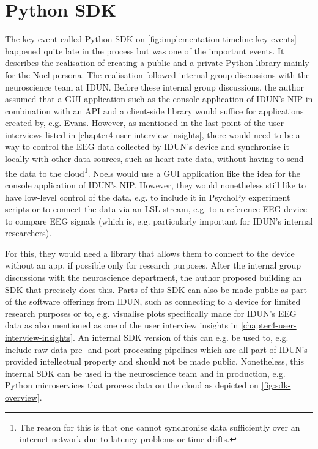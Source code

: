 \section*{Python SDK}
\label{chapter4-python-sdk}

The key event called Python SDK on \autoref{fig:implementation-timeline-key-events} happened quite late in the process but was one of the important events. It describes the realisation of creating a public and a private Python library mainly for the Noel persona. The realisation followed internal group discussions with the neuroscience team at IDUN. Before these internal group discussions, the author assumed that a GUI application such as the console application of IDUN's NIP in combination with an API and a client-side library would suffice for applications created by, e.g. Evans. However, as mentioned in the last point of the user interviews listed in \autoref{chapter4-user-interview-insights}, there would need to be a way to control the EEG data collected by IDUN's device and synchronise it locally with other data sources, such as heart rate data, without having to send the data to the cloud\footnote{The reason for this is that one cannot synchronise data sufficiently over an internet network due to latency problems or time drifts.}. Noels would use a GUI application like the idea for the console application of IDUN's NIP. However, they would nonetheless still like to have low-level control of the data, e.g. to include it in PsychoPy experiment scripts or to connect the data via an LSL stream, e.g. to a reference EEG device to compare EEG signals (which is, e.g. particularly important for IDUN's internal researchers).

For this, they would need a library that allows them to connect to the device without an app, if possible only for research purposes. After the internal group discussions with the neuroscience department, the author proposed building an SDK that precisely does this. Parts of this SDK can also be made public as part of the software offerings from IDUN, such as connecting to a device for limited research purposes or to, e.g. visualise plots specifically made for IDUN's EEG data as also mentioned as one of the user interview insights in \autoref{chapter4-user-interview-insights}. An internal SDK version of this can e.g. be used to, e.g. include raw data pre- and post-processing pipelines which are all part of IDUN's provided intellectual property and should not be made public. Nonetheless, this internal SDK can be used in the neuroscience team and in production, e.g. Python microservices that process data on the cloud as depicted on \autoref{fig:sdk-overview}.

